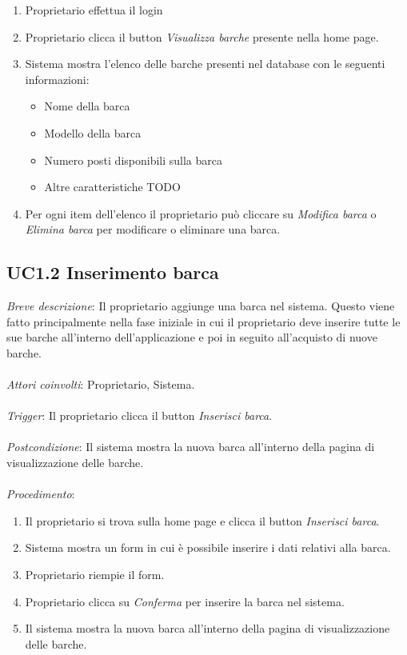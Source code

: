 \begin{enumerate}
    \item Proprietario effettua il login
    \item Proprietario clicca il button \textit{Visualizza barche} presente nella home page.
    \item Sistema mostra l'elenco delle barche presenti nel database con le seguenti informazioni:
          \begin{itemize}
              \item Nome della barca
              \item Modello della barca
              \item Numero posti disponibili sulla barca
              \item Altre caratteristiche TODO
          \end{itemize}
    \item Per ogni item dell'elenco il proprietario può cliccare su \textit{Modifica barca} o \textit{Elimina barca} per modificare o eliminare una barca.
\end{enumerate}

\subsection{UC1.2 Inserimento barca}

\emph{Breve descrizione}: Il proprietario aggiunge una barca nel sistema. Questo viene fatto principalmente nella fase iniziale in cui il proprietario deve inserire
tutte le sue barche all'interno dell'applicazione e poi in seguito all'acquisto di nuove barche.\\\\
\emph{Attori coinvolti}: Proprietario, Sistema.\\\\
\emph{Trigger}: Il proprietario clicca il button \textit{Inserisci barca}.\\\\
\emph{Postcondizione}: Il sistema mostra la nuova barca all'interno della pagina di visualizzazione delle barche.\\\\
\emph{Procedimento}:

\begin{enumerate}
    \item Il proprietario si trova sulla home page e clicca il button \textit{Inserisci barca}.
    \item Sistema mostra un form in cui è possibile inserire i dati relativi alla barca.
    \item Proprietario riempie il form.
    \item Proprietario clicca su \textit{Conferma} per inserire la barca nel sistema.
    \item Il sistema mostra la nuova barca all'interno della pagina di visualizzazione delle barche.
\end{enumerate}

